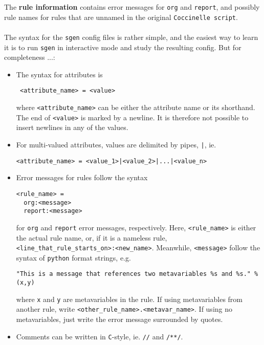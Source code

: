 The \textbf{rule information} contains error messages for \texttt{org} and \texttt{report}, and possibly rule names for rules that are unnamed in the original \texttt{Coccinelle script}.\\\\
\clearpage
\noindent The syntax for the \texttt{sgen} config files is rather simple, and the easiest way to learn it is to run \texttt{sgen} in interactive mode and study the resulting config. But for completeness ...:
\begin{itemize}
\item The syntax for attributes is
\begin{verbatim}
 <attribute_name> = <value>
\end{verbatim}
where \texttt{<attribute\_name>} can be either the attribute name or its shorthand. The end of \texttt{<value>} is marked by a newline. It is therefore not possible to insert newlines in any of the values.
\item For multi-valued attributes, values are delimited by pipes, \texttt{|}, ie.
\begin{verbatim}
<attribute_name> = <value_1>|<value_2>|...|<value_n>
\end{verbatim}
\item Error messages for rules follow the syntax
\begin{verbatim}
<rule_name> =
  org:<message>
  report:<message>
\end{verbatim}
for \texttt{org} and \texttt{report} error messages, respectively. Here, \texttt{<rule\_name>} is either the actual rule name, or, if it is a nameless rule, \texttt{<line\_that\_rule\_starts\_on>:<new\_name>}.\newline
Meanwhile, \texttt{<message>} follow the syntax of \texttt{python} format strings, e.g.
\begin{verbatim}
"This is a message that references two metavariables %s and %s." % (x,y)
\end{verbatim}
where \texttt{x} and \texttt{y} are metavariables in the rule. If using metavariables from another rule, write \texttt{<other\_rule\_name>.<metavar\_name>}. If using no metavariables, just write the error message surrounded by quotes.
\item Comments can be written in \texttt{C}-style, ie. \texttt{//} and \texttt{/**/}.
\end{itemize}
\bigskip

